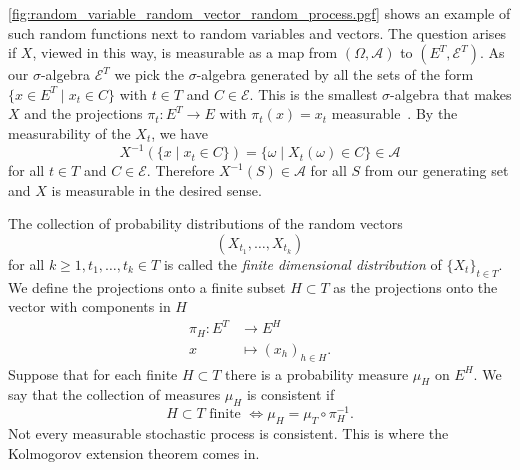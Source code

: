 \cref{fig:random_variable_random_vector_random_process.pgf} shows an example of such random functions next to random variables and vectors.
The question arises if $X$, viewed in this way, is measurable as a map from \( (\Omega, \mathcal{A}) \) to  \( (E^{T}, \mathcal{E}^{T}) \).
As our $\sigma$-algebra \( \mathcal{E}^{T} \) we pick the $\sigma$-algebra generated by all the sets of the form \( \{ x \in E^{T} \mid x_{t} \in C \}  \) with \( t \in T \) and \( C \in \mathcal{E} \).
This is the smallest $\sigma$-algebra that makes $X$ and the projections \( \pi_{t} \colon E^{T} \to E \) with \( \pi_{t}(x)=x_{t} \) measurable~\cite[Lemma 3.2]{bovier2022stochastic}.
By the measurability of the \( X_{t} \), we have
\[
    X^{-1}(\{x \mid x_{t} \in C\}) = \{ \omega \mid X_{t}(\omega) \in C\} \in \mathcal{A}
\]
for all \( t \in T \) and \( C \in \mathcal{E} \).
Therefore 
\( X^{-1}(S)  \in \mathcal{A} \) for all $S$ from our generating set and $X$ is measurable in the desired sense.



The collection of probability distributions of the random vectors
\[
    (X_{t_{1}},\dots, X_{t_{k}})
\]
for all \( k \geq 1, t_{1}, \dots, t_{k} \in T \) is called the \textit{finite dimensional distribution} of \( \{X_{t}\}_{t \in T} \).
We define the projections onto a finite subset \( H \subset T \) as the projections onto the vector with components in $H$
\begin{align*}
    \pi_{H} \colon E^{T} &\to E^{H}\\
    x &\mapsto (x_{h})_{h \in H}.
\end{align*}
Suppose that for each finite \( H \subset T \) there is a probability measure $\mu_{H}$ on $E^{H}$.
We say that the collection of measures \( \mu_{H}  \) is consistent if
\[
    H \subset T \text{ finite } \Leftrightarrow \mu_{H} = \mu_{T} \circ \pi_{H}^{-1}.
\]
Not every measurable stochastic process is consistent.
This is where the Kolmogorov extension theorem comes in.


